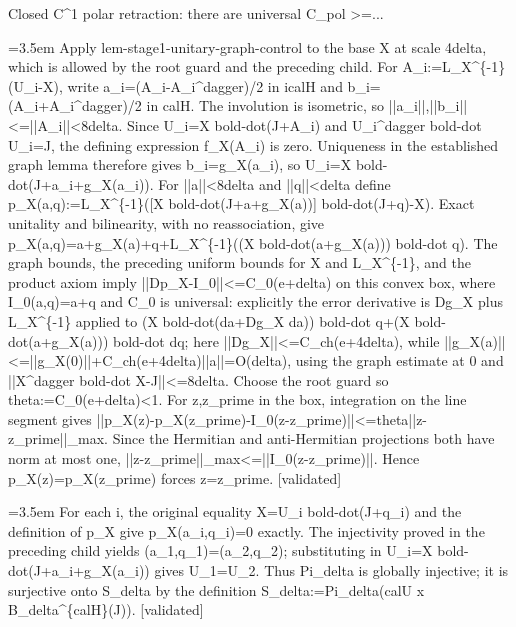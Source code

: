 \documentclass{article}
\newcommand{\step}[1]{\par\noindent\hangindent=3.5em\hangafter=1%
  \makebox[3.5em][l]{\textbf{#1.}}}
\newcommand{\steptag}[1]{\hfill{\small\textsf{[#1]}}}
\begin{document}
\begin{proofbox}{Closed C\textasciicircum{}1 polar retraction: there are universal C\_pol >=...}
\step{1.3.2.2} Apply lem-stage1-unitary-graph-control to the base X at scale 4delta, which is allowed by the root guard and the preceding child. For A\_i:=L\_X\textasciicircum{}\{-1\}(U\_i-X), write a\_i=(A\_i-A\_i\textasciicircum{}dagger)/2 in icalH and b\_i=(A\_i+A\_i\textasciicircum{}dagger)/2 in calH. The involution is isometric, so ||a\_i||,||b\_i||<=||A\_i||<8delta. Since U\_i=X bold-dot(J+A\_i) and U\_i\textasciicircum{}dagger bold-dot U\_i=J, the defining expression f\_X(A\_i) is zero. Uniqueness in the established graph lemma therefore gives b\_i=g\_X(a\_i), so U\_i=X bold-dot(J+a\_i+g\_X(a\_i)). For ||a||<8delta and ||q||<delta define p\_X(a,q):=L\_X\textasciicircum{}\{-1\}([X bold-dot(J+a+g\_X(a))] bold-dot(J+q)-X). Exact unitality and bilinearity, with no reassociation, give p\_X(a,q)=a+g\_X(a)+q+L\_X\textasciicircum{}\{-1\}((X bold-dot(a+g\_X(a))) bold-dot q). The graph bounds, the preceding uniform bounds for X and L\_X\textasciicircum{}\{-1\}, and the product axiom imply ||Dp\_X-I\_0||<=C\_0(e+delta) on this convex box, where I\_0(a,q)=a+q and C\_0 is universal: explicitly the error derivative is Dg\_X plus L\_X\textasciicircum{}\{-1\} applied to (X bold-dot(da+Dg\_X da)) bold-dot q+(X bold-dot(a+g\_X(a))) bold-dot dq; here ||Dg\_X||<=C\_ch(e+4delta), while ||g\_X(a)||<=||g\_X(0)||+C\_ch(e+4delta)||a||=O(delta), using the graph estimate at 0 and ||X\textasciicircum{}dagger bold-dot X-J||<=8delta. Choose the root guard so theta:=C\_0(e+delta)<1. For z,z\_prime in the box, integration on the line segment gives ||p\_X(z)-p\_X(z\_prime)-I\_0(z-z\_prime)||<=theta||z-z\_prime||\_max. Since the Hermitian and anti-Hermitian projections both have norm at most one, ||z-z\_prime||\_max<=||I\_0(z-z\_prime)||. Hence p\_X(z)=p\_X(z\_prime) forces z=z\_prime. \steptag{validated} \\[4pt]
\step{1.3.2.3} For each i, the original equality X=U\_i bold-dot(J+q\_i) and the definition of p\_X give p\_X(a\_i,q\_i)=0 exactly. The injectivity proved in the preceding child yields (a\_1,q\_1)=(a\_2,q\_2); substituting in U\_i=X bold-dot(J+a\_i+g\_X(a\_i)) gives U\_1=U\_2. Thus Pi\_delta is globally injective; it is surjective onto S\_delta by the definition S\_delta:=Pi\_delta(calU x B\_delta\textasciicircum{}\{calH\}(J)). \steptag{validated} \\[4pt]

\end{proofbox}
\end{document}
